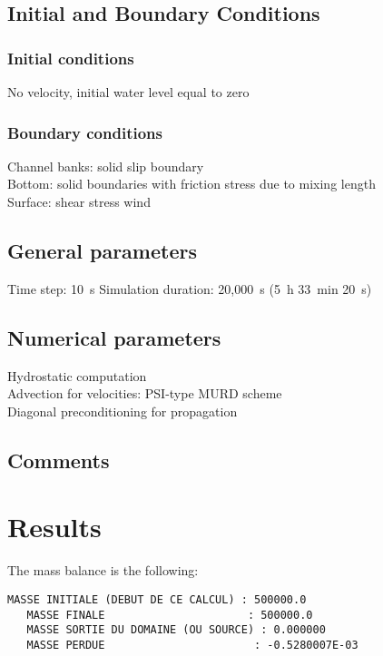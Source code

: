 \subsection{Initial and Boundary Conditions}
%
\subsubsection{Initial conditions}
%
No velocity, initial water level equal to zero
%
\subsubsection{Boundary conditions}
%
Channel banks: solid slip boundary\\
Bottom: solid boundaries with friction stress due to mixing length\\
Surface: shear stress wind
%
\subsection{General parameters}
%
Time step: 10~s
Simulation duration: 20,000~s (5~h 33~min 20~s)
%
%
%
\subsection{Numerical parameters}
%
Hydrostatic computation\\
Advection for velocities: PSI-type MURD scheme\\
Diagonal preconditioning for propagation
%
\subsection{Comments}
%
%
%
\section{Results}
%
The mass balance is the following:

\begin{lstlisting}[language=TelFortran]
   MASSE INITIALE (DEBUT DE CE CALCUL) : 500000.0
   MASSE FINALE                      : 500000.0
   MASSE SORTIE DU DOMAINE (OU SOURCE) : 0.000000
   MASSE PERDUE                       : -0.5280007E-03
\end{lstlisting}


